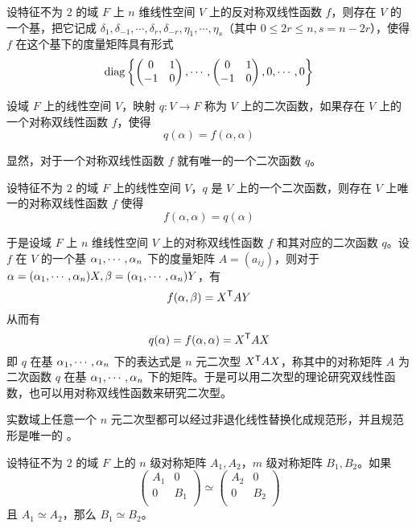 \begin{theorem}
    设特征不为 $2$ 的域 $F$ 上 $n$ 维线性空间 $V$ 上的反对称双线性函数 $f$，则存在 $V$ 的一个基，把它记成 $\delta_{1},\delta_{-1},\cdots,\delta_{r},\delta_{-r},\eta_1,\cdots,\eta_s$（其中 $0 \leqslant 2r \leqslant n, s = n-2r$），使得 $f$ 在这个基下的度量矩阵具有形式
    \[ \operatorname{diag}\left\{
        \left(\begin{matrix} 0 & 1 \\ -1 & 0 \end{matrix}\right),
        \cdots,
        \left(\begin{matrix} 0 & 1 \\ -1 & 0 \end{matrix}\right),
        0,\cdots,0
    \right\} \]
\end{theorem}

\begin{definition}
    设域 $F$ 上的线性空间 $V$，映射 $q : V \to F$ 称为 $V$ 上的二次函数，如果存在 $V$ 上的一个对称双线性函数 $f$，使得
    \[ q(\alpha) = f(\alpha,\alpha) \]
\end{definition}

显然，对于一个对称双线性函数 $f$ 就有唯一的一个二次函数 $q$。

\begin{theorem}
    设特征不为 $2$ 的域 $F$ 上的线性空间 $V$，$q$ 是 $V$ 上的一个二次函数，则存在 $V$ 上唯一的对称双线性函数 $f$ 使得
    \[ f(\alpha,\alpha) = q(\alpha) \]
\end{theorem}

于是设域 $F$ 上 $n$ 维线性空间 $V$ 上的对称双线性函数 $f$ 和其对应的二次函数 $q$。设 $f$ 在 $V$ 的一个基 $\alpha_1,\cdots,\alpha_n$ 下的度量矩阵 $A = (a_{ij})$，则对于 $\alpha = (\alpha_1,\cdots,\alpha_n)X,\beta = (\alpha_1,\cdots,\alpha_n)Y$，有
\[ f(\alpha,\beta) = {X}^\mathsf{T}AY \]
从而有
\[ q(\alpha) = f(\alpha,\alpha) = {X}^\mathsf{T}AX \]
即 $q$ 在基 $\alpha_1,\cdots,\alpha_n$ 下的表达式是 $n$ 元二次型 ${X}^\mathsf{T}AX$，称其中的对称矩阵 $A$ 为二次函数 $q$ 在基 $\alpha_1,\cdots,\alpha_n$ 下的矩阵。于是可以用二次型的理论研究双线性函数，也可以用对称双线性函数来研究二次型。

\begin{theorem}[惯性定理]
    实数域上任意一个 $n$ 元二次型都可以经过非退化线性替换化成规范形，并且规范形是唯一的 。
\end{theorem}

\begin{theorem}
    设特征不为 $2$ 的域 $F$ 上的 $n$ 级对称矩阵 $A_1,A_2$，$m$ 级对称矩阵 $B_1,B_2$。如果
    \[ \left(\begin{matrix}
        A_1 & 0   \\
        0   & B_1 \\
    \end{matrix}\right) \simeq \left(\begin{matrix}
        A_2 & 0   \\
        0   & B_2 \\
    \end{matrix}\right) \]
    且 $A_1 \simeq A_2$，那么 $B_1 \simeq B_2$。
\end{theorem}

